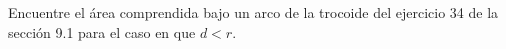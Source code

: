 \item Encuentre el área comprendida bajo un arco de la trocoide del ejercicio 34 de la sección 9.1 para el caso en que $d < r$.
